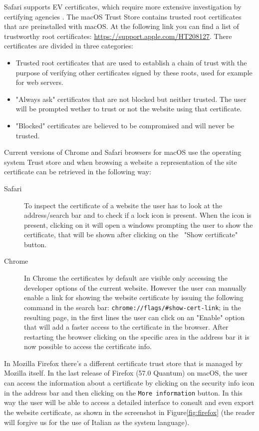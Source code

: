 \documentclass[11pt]{article}
\begin{document}
Safari supports EV certificates, which require more extensive investigation by certifying agencies \cite{safarisupport}. The macOS Trust Store contains trusted root certificates that are preinstalled with macOS. At the following link you can find a list of trustworthy root certificates: \url{https://support.apple.com/HT208127}. There certificates are divided in three categories:
\begin{itemize}
\item Trusted root certificates that are used to establish a chain of trust with the purpose of verifying other certificates signed by these roots, used for example for web servers.
\item "Always ask" certificates that are not blocked but neither trusted. The user will be prompted wether to trust or not the website using that certificate.
\item "Blocked" certificates are believed to be compromised and will never be trusted.
\end{itemize}
Current versions of Chrome and Safari browsers for macOS use the operating system Trust store and when browsing a website a representation of the site certificate can be retrieved in the following way:
\begin{description}
\item [Safari] To inspect the certificate of a website the user has to look at the address/search bar and to check if a lock icon is present. When the icon is present, clicking on it will open a windows prompting the user to show the certificate, that will be shown after clicking on the \
"Show certificate" button.
\item [Chrome] In Chrome the certificates by default are visible only accessing the developer options of the current website. However the user can manually enable a link for showing the website certificate by issuing the following command in the search bar: \texttt{chrome://flags/\#show-cert-link}; in the resulting page, in the first lines the user can click on an "Enable" option that will add a faster access to the certificate in the browser. After restarting the browser clicking on the specific area in the address bar it is now possible to access the certificate info.
\end{description}

In Mozilla Firefox there's a different certificate trust store that is managed by Mozilla itself. In the last release of Firefox (57.0 Quantum) on macOS, the user can access the information about a certificate by clicking on the security info icon in the address bar and then clicking on the \texttt{More information} button. In this way the user will be able to access a detailed interface to consult and even export the website certificate, as shown in the screenshot in Figure\ref{fig:firefox} (the reader will forgive us for the use of Italian as the system language).
\end{document}
